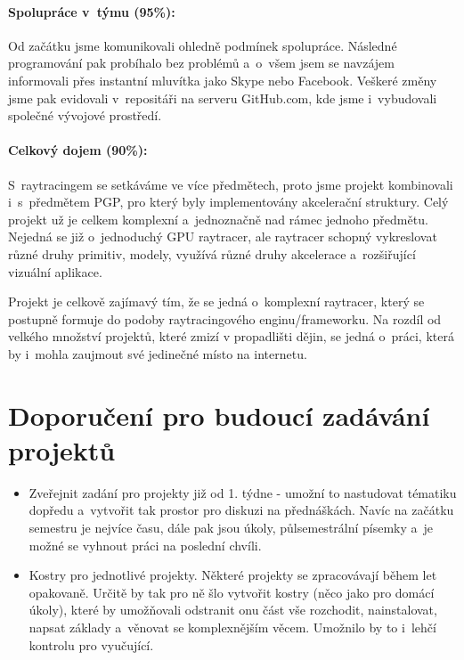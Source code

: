 \documentclass[12pt,a4paper,titlepage,final]{report}
\begin{document}
\paragraph{Spolupráce v~týmu (95\%):}
Od začátku jsme komunikovali ohledně podmínek spolupráce. Následné programování pak probíhalo bez problémů a~o~všem jsem se navzájem informovali přes instantní mluvítka jako Skype nebo Facebook. Veškeré změny jsme pak evidovali v~repositáři na serveru GitHub.com, kde jsme i~vybudovali společné vývojové prostředí.

\paragraph{Celkový dojem (90\%):} 

S~raytracingem se setkáváme ve více předmětech, proto jsme projekt kombinovali i~s~předmětem PGP, pro který byly implementovány akcelerační struktury. Celý projekt už je celkem komplexní a~jednoznačně nad rámec jednoho předmětu. Nejedná se již o~jednoduchý GPU raytracer, ale raytracer schopný vykreslovat různé druhy primitiv, modely, využívá různé druhy akcelerace a~rozšiřující vizuální aplikace.

Projekt je celkově zajímavý tím, že se jedná o~komplexní raytracer, který se postupně formuje do podoby raytracingového enginu/frameworku. Na rozdíl od velkého množství projektů, které zmizí v propadlišti dějin, se jedná o~práci, která by i~mohla zaujmout své jedinečné místo na internetu.


\section{Doporučení pro budoucí zadávání projektů}

\begin{itemize}
	\item Zveřejnit zadání pro projekty již od 1. týdne - umožní to nastudovat tématiku dopředu a~vytvořit tak prostor pro diskuzi na přednáškách. Navíc na začátku semestru je nejvíce času, dále pak jsou úkoly, půlsemestrální písemky a~je možné se vyhnout práci na poslední chvíli.
	\item Kostry pro jednotlivé projekty. Některé projekty se zpracovávají během let opakovaně. Určitě by tak pro ně šlo vytvořit kostry (něco jako pro domácí úkoly), které by umožňovali odstranit onu část vše rozchodit, nainstalovat, napsat základy a~věnovat se komplexnějším věcem. Umožnilo by to i~lehčí kontrolu pro vyučující.
\end{itemize}




\nocite{pgr-raytracing}
\nocite{aurelius}
\nocite{pgp-optimalizace}
\nocite{cuda-doc}
\nocite{phong-wiki}
\nocite{so-stack}
\nocite{bvh}
\nocite{cmemory}
\nocite{trier}
\nocite{STRACHOTA}
\nocite{HART}
\nocite{COOK}
\nocite{STOCHASTIC}
\nocite{FUSSELL}




\end{document}
